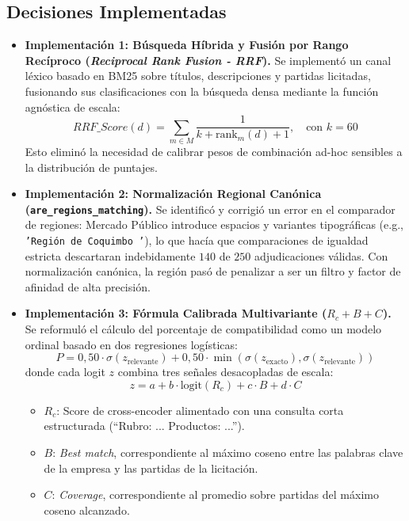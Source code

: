 \documentclass[11pt,a4paper]{article}
\begin{document}
\subsection{Decisiones Implementadas}

\begin{itemize}[leftmargin=*]
    \item \textbf{Implementación 1: Búsqueda Híbrida y Fusión por Rango Recíproco (\textit{Reciprocal Rank Fusion - RRF}).}
    Se implementó un canal léxico basado en BM25 sobre títulos, descripciones y partidas licitadas, fusionando sus clasificaciones con la búsqueda densa mediante la función agnóstica de escala:
    \begin{equation}
        RRF\_Score(d) = \sum_{m \in M} \frac{1}{k + \text{rank}_m(d) + 1}, \quad \text{con } k=60
    \end{equation}
    Esto eliminó la necesidad de calibrar pesos de combinación ad-hoc sensibles a la distribución de puntajes.

    \item \textbf{Implementación 2: Normalización Regional Canónica (\texttt{are\_regions\_matching}).}
    Se identificó y corrigió un error en el comparador de regiones: Mercado Público introduce espacios y variantes tipográficas (e.g., \texttt{'Región de Coquimbo '}), lo que hacía que comparaciones de igualdad estricta descartaran indebidamente $140$ de $250$ adjudicaciones válidas. Con normalización canónica, la región pasó de penalizar a ser un filtro y factor de afinidad de alta precisión.

    \item \textbf{Implementación 3: Fórmula Calibrada Multivariante ($R_c + B + C$).}
    Se reformuló el cálculo del porcentaje de compatibilidad como un modelo ordinal basado en dos regresiones logísticas:
    \begin{equation}
        P = 0{,}50 \cdot \sigma(z_{\text{relevante}}) + 0{,}50 \cdot \min\left(\sigma(z_{\text{exacto}}), \sigma(z_{\text{relevante}})\right)
    \end{equation}
    donde cada logit $z$ combina tres señales desacopladas de escala:
    \begin{equation}
        z = a + b \cdot \text{logit}(R_c) + c \cdot B + d \cdot C
    \end{equation}
    \begin{itemize}
        \item $R_c$: Score de cross-encoder alimentado con una consulta corta estructurada (``Rubro: ... Productos: ...'').
        \item $B$: \textit{Best match}, correspondiente al máximo coseno entre las palabras clave de la empresa y las partidas de la licitación.
        \item $C$: \textit{Coverage}, correspondiente al promedio sobre partidas del máximo coseno alcanzado.
    \end{itemize}


\end{itemize}
\end{document}
